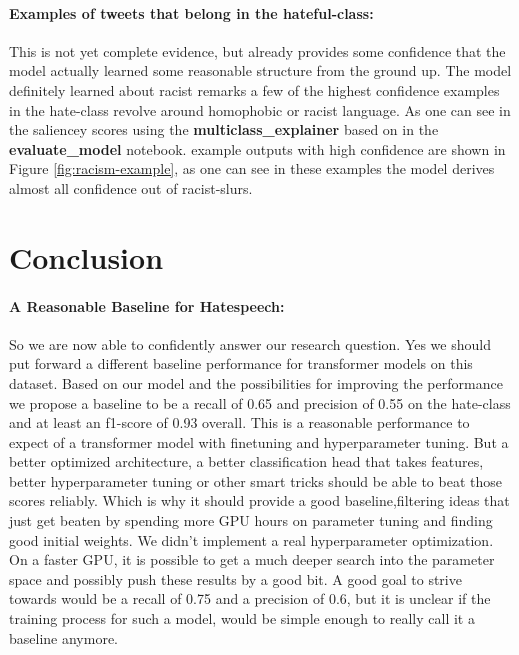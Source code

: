 \documentclass[11pt,a4paper]{article}
\begin{document}
\paragraph{Examples of tweets that belong in the hateful-class:}
\begin{center}
\newline
\end{center}

This is not yet complete evidence, but already provides some confidence that the model actually learned some reasonable structure from the ground up.
The model definitely learned about racist remarks a few of the highest confidence examples in the hate-class revolve around homophobic or racist language.
As one can see in the saliencey scores using the \textbf{multiclass\_explainer} based on \cite{saliency_paper} in the \textbf{evaluate\_model} notebook.
example outputs with high confidence are shown in Figure \ref{fig:racism-example},
as one can see in these examples the model derives almost all confidence out of racist-slurs.

\newpage
\section{Conclusion}
\paragraph{A Reasonable Baseline for Hatespeech:}
So we are now able to confidently answer our research question.
Yes we should put forward a different baseline performance for transformer models on this dataset.
Based on our model and the possibilities for improving the performance we propose a baseline to be 
a recall of 0.65 and precision of 0.55 on the hate-class and at least an f1-score of 0.93 overall.
This is a reasonable performance to expect of a transformer model with finetuning
and hyperparameter tuning.
But a better optimized architecture, a better classification head that takes features, better hyperparameter tuning or other smart tricks
should be able to beat those scores reliably.
Which is why it should provide a good baseline,filtering ideas that just get beaten by spending more GPU hours on parameter tuning and finding good initial weights.
We didn't implement a real hyperparameter optimization.
On a faster GPU, it is possible to get a much deeper search into the parameter space and possibly push these results by a good bit.
A good goal to strive towards would be a recall of 0.75 and a precision of 0.6, but it is unclear if the training process for such a model, would 
be simple enough to really call it a baseline anymore.
\end{document}
